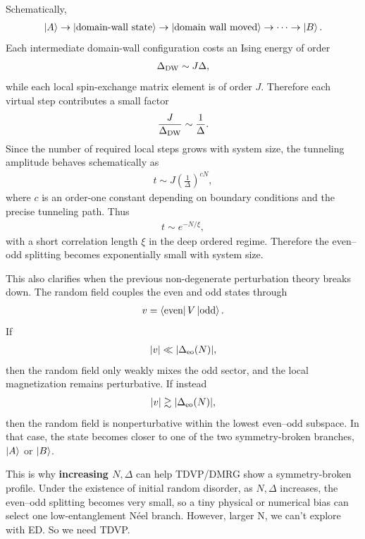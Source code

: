 \documentclass[11pt]{article}
\begin{document}
Schematically,
\begin{align}
    \ket{A}
    \rightarrow
    \ket{\text{domain-wall state}}
    \rightarrow
    \ket{\text{domain wall moved}}
    \rightarrow
    \cdots
    \rightarrow
    \ket{B}.
\end{align}
Each intermediate domain-wall configuration costs an Ising energy of order
\begin{align}
    \Delta_{\rm DW} \sim J\Delta,
\end{align}
while each local spin-exchange matrix element is of order $J$. Therefore each
virtual step contributes a small factor
\begin{align}
    \frac{J}{\Delta_{\rm DW}}
    \sim
    \frac{1}{\Delta}.
\end{align}
Since the number of required local steps grows with system size, the tunneling
amplitude behaves schematically as
\begin{align}
    t
    \sim
    J
    \left(
        \frac{1}{\Delta}
    \right)^{cN},
\end{align}
where $c$ is an order-one constant depending on boundary conditions and the
precise tunneling path. Thus
\begin{align}
    t
    \sim
    e^{-N/\xi},
\end{align}
with a short correlation length $\xi$ in the deep ordered regime. Therefore the even--odd splitting becomes exponentially small with system size. 

This also clarifies when the previous non-degenerate perturbation theory breaks down.
The random field couples the even and odd states through
\begin{align}
    v
    =
    \bra{\rm even}
    V
    \ket{\rm odd}.
\end{align}
If
\begin{align}
    |v| \ll |\Delta_{\rm eo}(N)|,
\end{align}
then the random field only weakly mixes the odd sector, and the local magnetization remains
perturbative. If instead
\begin{align}
    |v| \gtrsim |\Delta_{\rm eo}(N)|,
\end{align}
then the random field is nonperturbative within the lowest even--odd subspace. In that
case, the state becomes closer to one of the two symmetry-broken branches, $\ket{A}$ or
$\ket{B}$.

This is why \textbf{increasing $N,\Delta$} can help TDVP/DMRG show a symmetry-broken profile. Under the existence of initial random disorder, as $N,\Delta$
increases, the even--odd splitting becomes very small, so a tiny physical or numerical bias
can select one low-entanglement N\'eel branch. However, larger N, we can't explore with ED. So we need TDVP.
\end{document}
